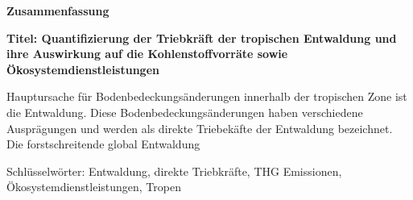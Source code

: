 \thispagestyle{empty}

\begin{de}
	\begin{center}
		\textbf{Zusammenfassung}
	\end{center}
	\textbf{Titel: Quantifizierung der Triebkräft der tropischen Entwaldung und ihre Auswirkung auf die Kohlenstoffvorräte sowie Ökosystemdienstleistungen}

	Hauptursache für Bodenbedeckungsänderungen innerhalb der tropischen Zone ist die Entwaldung. Diese Bodenbedeckungsänderungen haben verschiedene Ausprägungen und werden als direkte Triebekäfte der Entwaldung bezeichnet. Die forstschreitende global Entwaldung 

	Schlüsselwörter: Entwaldung, direkte Triebkräfte, THG Emissionen, Ökosystemdienstleistungen, Tropen
\end{de}